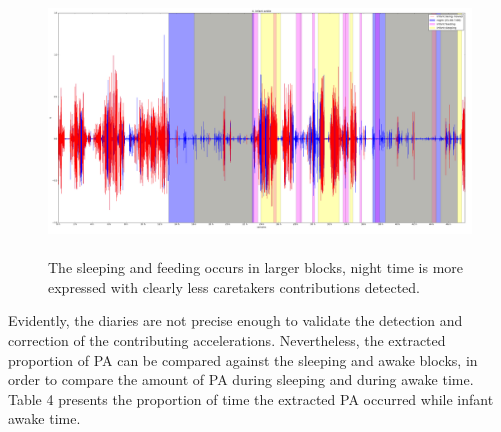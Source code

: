 \documentclass{article}
\begin{document}
{\begin{figure}[h!]
\includegraphics[width=15cm, height=7cm]{4moved.png}
\caption{The sleeping and feeding occurs in larger blocks, night time is more expressed with clearly less caretakers contributions detected.}
\end{figure}
Evidently, the diaries are not precise enough to validate the detection and correction of the contributing accelerations. Nevertheless, the extracted proportion of PA can be compared against the sleeping and awake blocks, in order to compare the amount of PA during sleeping and during awake time. Table 4 presents the proportion of time the extracted PA occurred while infant awake time.\\

}
\end{document}
